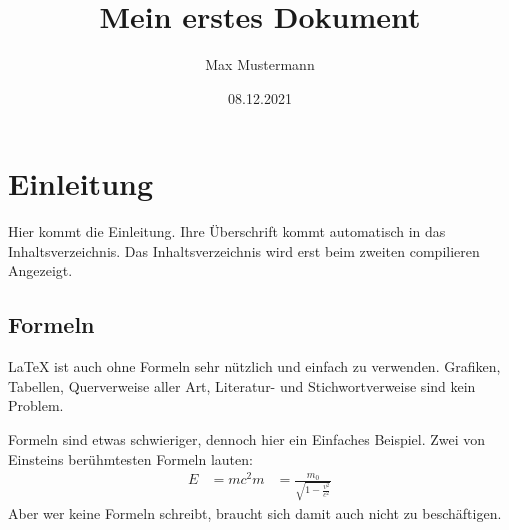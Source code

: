 \documentclass[a4paper,10pt]{scrartcl}
\title{Mein erstes Dokument}
\author{Max Mustermann}
\date{08.12.2021}
\begin{document}
\maketitle
\tableofcontents

\section{Einleitung}
Hier kommt die Einleitung. Ihre Überschrift kommt automatisch in das Inhaltsverzeichnis. Das Inhaltsverzeichnis wird erst beim zweiten compilieren Angezeigt.

\subsection{Formeln}
\LaTeX{} ist auch ohne Formeln sehr nützlich und einfach zu verwenden. Grafiken, Tabellen, Querverweise aller Art, Literatur- und Stichwortverweise sind kein Problem.

Formeln sind etwas schwieriger, dennoch hier ein Einfaches Beispiel. Zwei von Einsteins berühmtesten Formeln lauten:
\begin{align}
E &= mc^2
m &= \frac{m_0}{\sqrt{1-\frac{v^2}{c^2}}}
\end{align}
Aber wer keine Formeln schreibt, braucht sich damit auch nicht zu beschäftigen.
\end{document}
